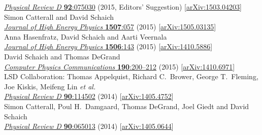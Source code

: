 \begin{spacelistout}
\begin{revnumerate}
      \href{http://dx.doi.org/10.1103/PhysRevD.92.075030}{\textit{Physical Review D} \textbf{92}:075030} (2015, Editors' Suggestion) [\href{http://arxiv.org/abs/1503.04203}{arXiv:1503.04203}]
    \pagebreakitem
       \\
      Simon Catterall and David Schaich \\
      \href{http://dx.doi.org/10.1007/JHEP07(2015)057}{\textit{Journal of High Energy Physics} \textbf{1507}:057} (2015) [\href{http://arxiv.org/abs/1505.03135}{arXiv:1505.03135}]
    \pagebreakitem
       \\
      Anna Hasenfratz, David Schaich and Aarti Veernala \\
      \href{http://dx.doi.org/10.1007/JHEP06(2015)143}{\textit{Journal of High Energy Physics} \textbf{1506}:143} (2015) [\href{http://arxiv.org/abs/1410.5886}{arXiv:1410.5886}]
    \pagebreakitem
       \\
      David Schaich and Thomas DeGrand \\
      \href{http://dx.doi.org/10.1016/j.cpc.2014.12.025}{\textit{Computer Physics Communications} \textbf{190}:200--212} (2015) [\href{http://arxiv.org/abs/1410.6971}{arXiv:1410.6971}]
    \pagebreakitem
       \\
      LSD Collaboration: Thomas Appelquist, Richard C.~Brower, George T.~Fleming, Joe Kiskis, Meifeng Lin \textit{et al.} \\ %
      \href{http://dx.doi.org/10.1103/PhysRevD.90.114502}{\textit{Physical Review D} \textbf{90}:114502} (2014) [\href{http://arxiv.org/abs/1405.4752}{arXiv:1405.4752}]
    \pagebreakitem
       \\
      Simon Catterall, Poul H.~Damgaard, Thomas DeGrand, Joel Giedt and David Schaich \\
      \href{http://dx.doi.org/10.1103/PhysRevD.90.065013}{\textit{Physical Review D} \textbf{90}:065013} (2014) [\href{http://arxiv.org/abs/1405.0644}{arXiv:1405.0644}]
    \pagebreakitem
       \\

\end{revnumerate}
\end{spacelistout}

